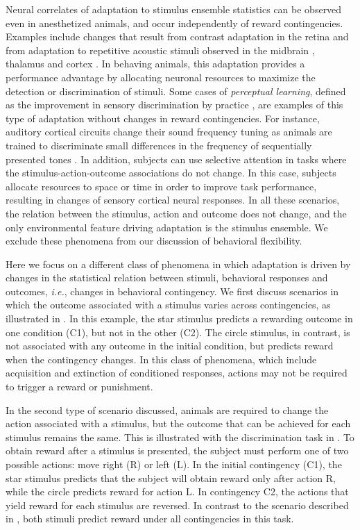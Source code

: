 Neural correlates of adaptation to stimulus ensemble statistics can be observed even in anesthetized animals, and occur independently of reward contingencies. Examples include changes that result from contrast adaptation in the retina \citep{Baccus2002} and from adaptation to repetitive acoustic stimuli observed in the midbrain \citep{Malmierca2009}, thalamus \citep{Anderson2009} and cortex \citep{Ulanovsky2003}. 
%
In behaving animals, this adaptation provides a performance advantage by allocating neuronal resources to maximize the detection or discrimination of stimuli.
%
Some cases of \emph{perceptual learning}, defined as the improvement in sensory discrimination by practice \citep{Goldstone1998}, are examples of this type of adaptation without changes in reward contingencies. For instance, auditory cortical circuits change their sound frequency tuning as animals are trained to discriminate small differences in the frequency of sequentially presented tones \citep{Recanzone1993}.
%
In addition, subjects can use selective attention in tasks where the stimulus-action-outcome associations do not change.
In this case, subjects allocate resources to space \citep{Posner1980} or time \citep{Jaramillo2011} in order to improve task performance, resulting in changes of sensory cortical neural responses.
%
In all these scenarios, the relation between the stimulus, action and outcome does not change, and the only environmental feature driving adaptation is the stimulus ensemble. We exclude these phenomena from our discussion of behavioral flexibility. 

Here we focus on a different class of phenomena in which adaptation is driven by changes in the statistical relation between stimuli, behavioral responses and outcomes, \emph{i.e.}, changes in behavioral contingency. We first discuss scenarios in which the outcome associated with a stimulus varies across contingencies, as illustrated in \fig{\StimOutcome}. In this example, the star stimulus predicts a rewarding outcome in one condition (C1), but not in the other (C2). The circle stimulus, in contrast, is not associated with any outcome in the initial condition, but predicts reward when the contingency changes.
%
In this class of phenomena, which include acquisition and extinction of conditioned responses, actions may not be required to trigger a reward or punishment.

In the second type of scenario discussed, animals are required to change the action associated with a stimulus, but the outcome that can be achieved for each stimulus remains the same. 
%
This is illustrated with the discrimination task in \fig{\StimAction}. To obtain reward after a stimulus is presented, the subject must perform one of two possible actions: move right (R) or left (L). In the initial contingency (C1), the star stimulus predicts that the subject will obtain reward only after action R, while the circle predicts reward for action L. In contingency C2, the actions that yield reward for each stimulus are reversed. In contrast to the scenario described in \fig{\StimOutcome}, both stimuli predict reward under all contingencies in this task.
 
